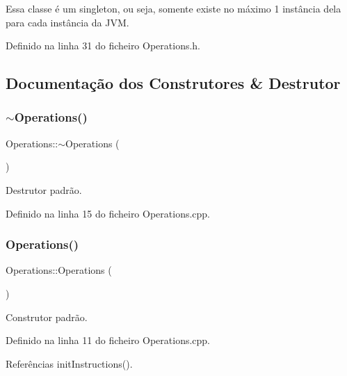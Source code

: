 Essa classe é um singleton, ou seja, somente existe no máximo 1 instância dela para cada instância da J\+VM. 

Definido na linha 31 do ficheiro Operations.\+h.



\subsection{Documentação dos Construtores \& Destrutor}
\mbox{\label{classOperations_acfd66736f28837cca7379254a6eb988c}} 
\subsubsection{\texorpdfstring{$\sim$\+Operations()}{~Operations()}}
{\footnotesize\ttfamily Operations\+::$\sim$\+Operations (\begin{DoxyParamCaption}{ }\end{DoxyParamCaption})}



Destrutor padrão. 



Definido na linha 15 do ficheiro Operations.\+cpp.

\mbox{\label{classOperations_af344ca561c1a08118f686551abb08efb}} 
\subsubsection{\texorpdfstring{Operations()}{Operations()}\hspace{0.1cm}{\footnotesize\ttfamily [1/2]}}
{\footnotesize\ttfamily Operations\+::\+Operations (\begin{DoxyParamCaption}{ }\end{DoxyParamCaption})\hspace{0.3cm}{\ttfamily [private]}}



Construtor padrão. 



Definido na linha 11 do ficheiro Operations.\+cpp.



Referências init\+Instructions().

